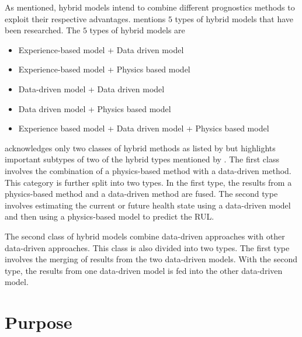As mentioned, hybrid models intend to combine different prognostics methods to exploit their respective advantages. \cite{Liao2014} mentions $5$ types of hybrid models that have been researched. The $5$ types of hybrid models are

\begin{itemize}
	\item Experience-based model + Data driven model
	\item Experience-based model + Physics based model
	\item Data-driven model + Data driven model
	\item Data driven model + Physics based model
	\item Experience based model + Data driven model + Physics based model
\end{itemize}


\cite{Xia2018} acknowledges only two classes of hybrid methods as listed by \cite{Liao2014} but highlights important subtypes of two of the hybrid types mentioned by \cite{Liao2014}. The first class involves the combination of a physics-based method with a data-driven method. This category is further split into two types. In the first type, the results from a physics-based method and a data-driven method are fused. The second type involves estimating the current or future health state using a data-driven model and then using a physics-based model to predict the RUL. 

The second class of hybrid models combine data-driven approaches with other data-driven approaches. This class is also divided into two types. The first type involves the merging of results from the two data-driven models. With the second type, the results from one data-driven model is fed into the other data-driven model.





\section{Purpose} %

